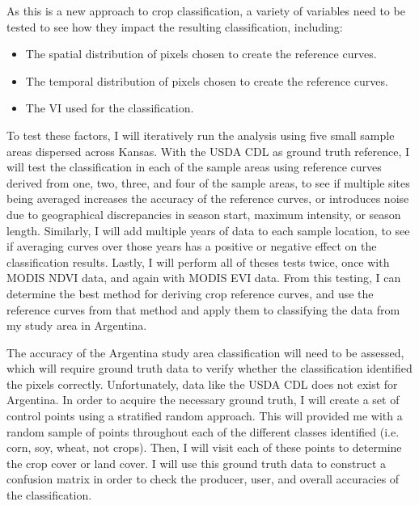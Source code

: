 As this is a new approach to crop classification, a variety of variables need to be tested to see how they impact the resulting classification, including:
\begin{spacing}{1.2}
\begin{itemize}
  \item The spatial distribution of pixels chosen to create the reference curves.
  \item The temporal distribution of pixels chosen to create the reference curves.
  \item The VI used for the classification.
\end{itemize}
\end{spacing}
To test these factors, I will iteratively run the analysis using five small sample areas dispersed across Kansas. With the USDA CDL as ground truth reference, I will test the classification in each of the sample areas using reference curves derived from one, two, three, and four of the sample areas, to see if multiple sites being averaged increases the accuracy of the reference curves, or introduces noise due to geographical discrepancies in season start, maximum intensity, or season length. Similarly, I will add multiple years of data to each sample location, to see if averaging curves over those years has a positive or negative effect on the classification results. Lastly, I will perform all of theses tests twice, once with MODIS NDVI data, and again with MODIS EVI data. From this testing, I can determine the best method for deriving crop reference curves, and use the reference curves from that method and apply them to classifying the data from my study area in Argentina.

The accuracy of the Argentina study area classification will need to be assessed, which will require ground truth data to verify whether the classification identified the pixels correctly. Unfortunately, data like the USDA CDL does not exist for Argentina. In order to acquire the necessary ground truth, I will create a set of control points using a stratified random approach. This will provided me with a random sample of points throughout each of the different classes identified (i.e. corn, soy, wheat, not crops). Then, I will visit each of these points to determine the crop cover or land cover. I will use this ground truth data to construct a confusion matrix in order to check the producer, user, and overall accuracies of the classification.